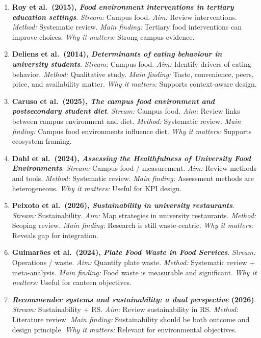 \begin{enumerate}
  healthcare RS. \emph{Method:} State-of-the-art review. \emph{Main
  finding:} Food RS fit within digital health RS. \emph{Why it matters:}
  Useful positioning paper.
\item
  \textbf{Roy et al.~(2015), \emph{Food environment interventions in
  tertiary education settings}}. \emph{Stream:} Campus food. \emph{Aim:}
  Review interventions. \emph{Method:} Systematic review. \emph{Main
  finding:} Tertiary food interventions can improve choices. \emph{Why
  it matters:} Strong campus evidence.
\item
  \textbf{Deliens et al.~(2014), \emph{Determinants of eating behaviour
  in university students}}. \emph{Stream:} Campus food. \emph{Aim:}
  Identify drivers of eating behavior. \emph{Method:} Qualitative study.
  \emph{Main finding:} Taste, convenience, peers, price, and
  availability matter. \emph{Why it matters:} Supports context-aware
  design.
\item
  \textbf{Caruso et al.~(2025), \emph{The campus food environment and
  postsecondary student diet}}. \emph{Stream:} Campus food. \emph{Aim:}
  Review links between campus environment and diet. \emph{Method:}
  Systematic review. \emph{Main finding:} Campus food environments
  influence diet. \emph{Why it matters:} Supports ecosystem framing.
\item
  \textbf{Dahl et al.~(2024), \emph{Assessing the Healthfulness of
  University Food Environments}}. \emph{Stream:} Campus food /
  measurement. \emph{Aim:} Review methods and tools. \emph{Method:}
  Systematic review. \emph{Main finding:} Assessment methods are
  heterogeneous. \emph{Why it matters:} Useful for KPI design.
\item
  \textbf{Peixoto et al.~(2026), \emph{Sustainability in university
  restaurants}}. \emph{Stream:} Sustainability. \emph{Aim:} Map
  strategies in university restaurants. \emph{Method:} Scoping review.
  \emph{Main finding:} Research is still waste-centric. \emph{Why it
  matters:} Reveals gap for integration.
\item
  \textbf{Guimarães et al.~(2024), \emph{Plate Food Waste in Food
  Services}}. \emph{Stream:} Operations / waste. \emph{Aim:} Quantify
  plate waste. \emph{Method:} Systematic review + meta-analysis.
  \emph{Main finding:} Food waste is measurable and significant.
  \emph{Why it matters:} Useful for canteen objectives.
\item
  \textbf{\emph{Recommender systems and sustainability: a dual
  perspective} (2026)}. \emph{Stream:} Sustainability + RS. \emph{Aim:}
  Review sustainability in RS. \emph{Method:} Literature review.
  \emph{Main finding:} Sustainability should be both outcome and design
  principle. \emph{Why it matters:} Relevant for environmental
  objectives.
\end{enumerate}

